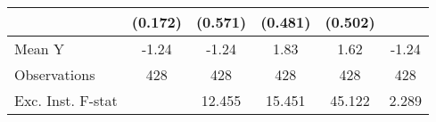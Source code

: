 {\begin{tabular}{l*{5}{c}}
            &     (0.172)         &     (0.571)         &     (0.481)         &     (0.502)         &                     \\
\midrule
Mean Y      &       -1.24         &       -1.24         &        1.83         &        1.62         &       -1.24         \\
Observations&         428         &         428         &         428         &         428         &         428         \\
Exc. Inst. F-stat&                     &      12.455         &      15.451         &      45.122         &       2.289         \\
\bottomrule
\end{tabular}
}
